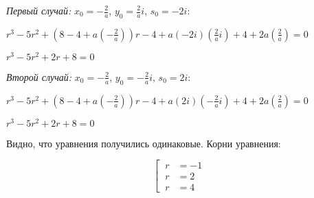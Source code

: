 \vspace{1mm}
\textit{Первый случай:} $ x_0 = -\frac{2}{a} $, $ y_0 = \frac{2}{a}i $, $ s_0 = -2i $:
\vspace{2mm}

$ r^3 - 5r^2 + (8 - 4 + a(-\frac{2}{a}))r - 4 + a(-2i)(\frac{2}{a}i) + 4 + 2a(\frac{2}{a}) = 0 $

$ r^3 - 5r^2 + 2r + 8 = 0 $

\vspace{1mm}
\textit{Второй случай:} $ x_0 = -\frac{2}{a} $, $ y_0 = -\frac{2}{a}i $, $ s_0 = 2i $:
\vspace{2mm}

$ r^3 - 5r^2 + (8 - 4 + a(-\frac{2}{a}))r - 4 + a(2i)(-\frac{2}{a}i) + 4 + 2a(\frac{2}{a}) = 0 $

$ r^3 - 5r^2 + 2r + 8 = 0 $

\vspace{1mm}

Видно, что уравнения получились одинаковые. Корни уравнения:

$$
	\left[\
		\begin{aligned}
			r &= - 1 \\
			r &= 2 \\
			r &= 4
		\end{aligned}
	\right.
$$